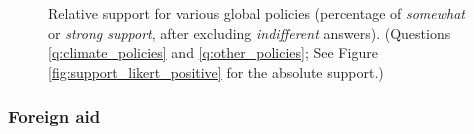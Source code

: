 \setcounter{figure}{1}
\renewcommand{\thefigure}{\arabic{figure}}
\begin{figure}
  \caption[Relative support for further global policies]{Relative support for various global policies (percentage of \textit{somewhat} or \textit{strong support}, after excluding \textit{indifferent} answers). (Questions \ref{q:climate_policies} and \ref{q:other_policies}; See Figure \ref{fig:support_likert_positive} for the absolute support.)%
  }
  \label{fig:support}
\end{figure} 
\renewcommand{\thefigure}{S\arabic{figure}}

\subsubsection{Foreign aid}\label{subsubsec:support_foreign_aid} %

